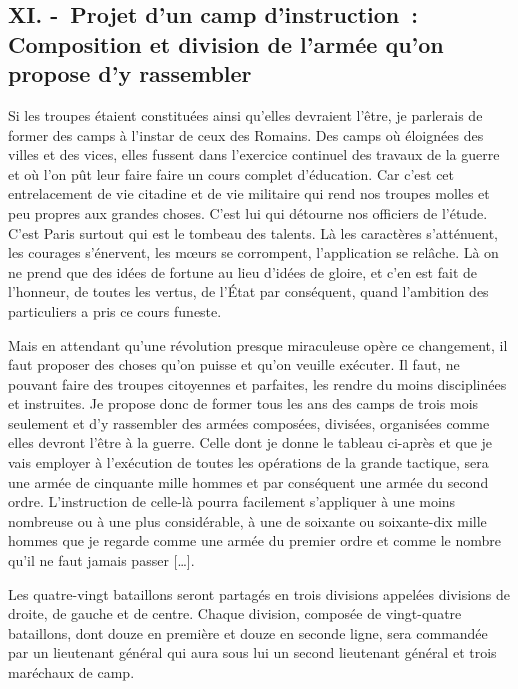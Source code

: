 \documentclass[french,twoside]{book} %
\begin{document}
\subsection[{XI. - Projet d’un camp d’instruction : Composition et division de l’armée qu’on propose d’y rassembler}]{XI. - Projet d’un camp d’instruction : Composition et division de l’armée qu’on propose d’y rassembler}
\noindent Si les troupes étaient constituées ainsi qu’elles devraient l’être, je parlerais de former des camps à l’instar de ceux des Romains. Des camps où éloignées des villes et des vices, elles fussent dans l’exercice continuel des travaux de la guerre et où l’on pût leur faire faire un cours complet d’éducation. Car c’est cet entrelacement de vie citadine et de vie militaire qui rend nos troupes molles et peu propres aux grandes choses. C’est lui qui détourne nos officiers de l’étude. C’est Paris surtout qui est le tombeau des talents. Là les caractères s’atténuent, les courages s’énervent, les mœurs se corrompent, l’application se relâche. Là on ne prend que des idées de fortune au lieu d’idées de gloire, et c’en est fait de l’honneur, de toutes les vertus, de l’État par conséquent, quand l’ambition des particuliers a pris ce cours funeste.\par
Mais en attendant qu’une révolution presque miraculeuse opère ce changement, il faut proposer des choses qu’on puisse et qu’on veuille exécuter. Il faut, ne pouvant faire des troupes citoyennes et parfaites, les rendre du moins disciplinées et instruites. Je propose donc de former tous les ans des camps de trois mois seulement et d’y rassembler des armées composées, divisées, organisées comme elles devront l’être à la guerre. Celle dont je donne le tableau ci-après et que je vais employer à l’exécution de toutes les opérations de la grande tactique, sera une armée de cinquante mille hommes et par conséquent une armée du second ordre. L’instruction de celle-là pourra facilement s’appliquer à une moins nombreuse ou à une plus considérable, à une de soixante ou soixante-dix mille hommes que je regarde comme une armée du premier ordre et comme le nombre qu’il ne faut jamais passer […].\par
Les quatre-vingt bataillons seront partagés en trois divisions appelées divisions de droite, de gauche et de centre. Chaque division, composée de vingt-quatre bataillons, dont douze en première et douze en seconde ligne, sera commandée par un lieutenant général qui aura sous lui un second lieutenant général et trois maréchaux de camp.\par
\end{document}
